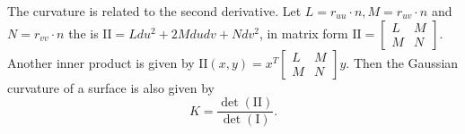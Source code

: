 The curvature is related to the second derivative.
Let $L=r_{uu}\cdot n, M=r_{uv}\cdot n$ and $N=r_{vv}\cdot n$ the
 is $\mathrm{I\!I}=Ldu^2+2Mdudv+Ndv^2$,
in matrix form $\mathrm{I\!I}=\begin{bmatrix}
L & M \\
M & N 
\end{bmatrix}.$
Another inner product is given by $\mathrm{I\!I}(x,y)=x^T\begin{bmatrix}
L & M \\
M & N 
\end{bmatrix}y.$
Then the Gaussian curvature of a surface is also given by
\begin{equation}\label{eqn:curve-dets}
 	K=\frac{\det(\mathrm{I\!I})}{\det(\mathrm{I})}.
\end{equation}


